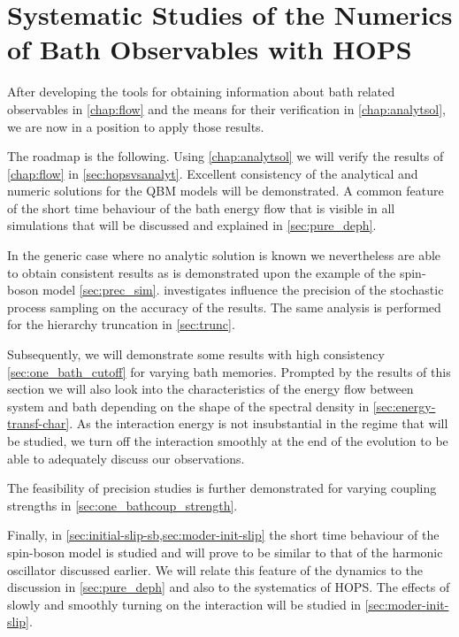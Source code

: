 \chapter{Systematic Studies of the Numerics of Bath Observables with
  HOPS}
\label{chap:numres}
After developing the tools for obtaining information about bath
related observables in \cref{chap:flow} and the means for their
verification in \cref{chap:analytsol}, we are now in a position to
apply those results.

The roadmap is the following. Using \cref{chap:analytsol} we will
verify the results of \cref{chap:flow} in
\cref{sec:hopsvsanalyt}. Excellent consistency of the analytical and
numeric solutions for the QBM models will be demonstrated.  A common
feature of the short time behaviour of the bath energy flow that is
visible in all simulations that will be discussed and explained in
\cref{sec:pure_deph}.

In the generic case where no analytic solution is known we
nevertheless are able to obtain consistent results as is demonstrated
upon the example of the spin-boson model \cref{sec:prec_sim}.
 investigates influence the precision of the
stochastic process sampling on the accuracy of the results. The same
analysis is performed for the hierarchy truncation in
\cref{sec:trunc}.

Subsequently, we will demonstrate some results with high consistency
\cref{sec:one_bath_cutoff} for varying bath memories.  Prompted by the
results of this section we will also look into the characteristics of
the energy flow between system and bath depending on the shape of the
spectral density in \cref{sec:energy-transf-char}. As the interaction
energy is not insubstantial in the regime that will be studied, we
turn off the interaction smoothly at the end of the evolution to be
able to adequately discuss our observations.

The feasibility of precision studies is further demonstrated for
varying coupling strengths in \cref{sec:one_bathcoup_strength}.

Finally, in \cref{sec:initial-slip-sb,sec:moder-init-slip} the short
time behaviour of the spin-boson model is studied and will prove to be
similar to that of the harmonic oscillator discussed earlier. We will
relate this feature of the dynamics to the discussion in
\cref{sec:pure_deph} and also to the systematics of HOPS. The effects
of slowly and smoothly turning on the interaction will be studied in
\cref{sec:moder-init-slip}.

